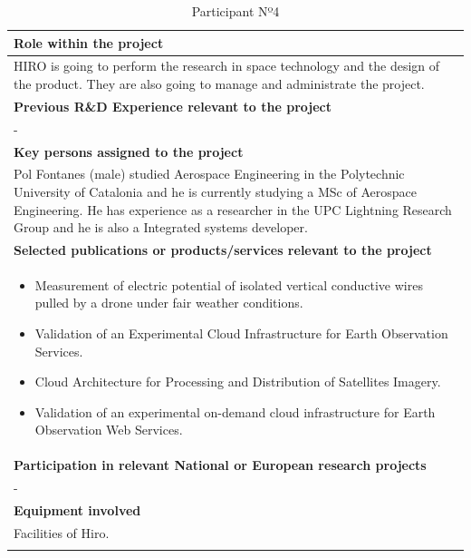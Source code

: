 \begin{longtable}[H]{|p{0.7cm}|p{4cm}|p{7cm}|p{1.3cm}|}
	\multicolumn{4}{|p{13cm}|}{\textbf{Role within the project}}   \\ \hline
	
	\multicolumn{4}{|p{14.5cm}|}{HIRO is going to perform the research in space technology and the design of the product. They are also going to manage and administrate the project.}  \\ \hline
	
	\multicolumn{4}{|p{13cm}|}{\textbf{Previous R\&D Experience relevant to the project}}  \\ \hline
	
	\multicolumn{4}{|p{14.5cm}|}{-}  \\ \hline
	
	\multicolumn{4}{|p{13cm}|}{\textbf{Key persons assigned to the project}}   \\ \hline
	
	\multicolumn{4}{|p{14.5cm}|}{Pol Fontanes (male) studied Aerospace Engineering in the Polytechnic University of Catalonia and he is currently studying a MSc of Aerospace Engineering. He has experience as a researcher in the UPC Lightning Research Group and he is also a Integrated systems developer.} \\ \hline
	
	\multicolumn{4}{|p{13cm}|}{\textbf{Selected publications or products/services relevant to the project}}  \\ \hline
	
	\multicolumn{4}{|p{14.5cm}|}{
		\begin{itemize}
			\item \vspace{-0.5cm}Measurement of electric potential of isolated vertical conductive wires pulled by a drone under fair weather conditions.
			\item Validation of an Experimental Cloud Infrastructure for Earth Observation Services.
			\item Cloud Architecture for Processing and Distribution of Satellites Imagery.
			\item Validation of an experimental on-demand cloud infrastructure for Earth Observation Web Services.\vspace{-0.3cm}
		\end{itemize}}  \\ \hline
	
	\multicolumn{4}{|p{13cm}|}{\textbf{Participation in relevant National or European research projects}}  \\ \hline
	
	\multicolumn{4}{|p{14.5cm}|}{-}  \\ \hline
	
	\multicolumn{4}{|p{13cm}|}{\textbf{Equipment involved}}  \\ \hline
	
	\multicolumn{4}{|p{14.5cm}|}{Facilities of Hiro.}  \\ \hline
	\caption{Participant Nº4}
\end{longtable}



